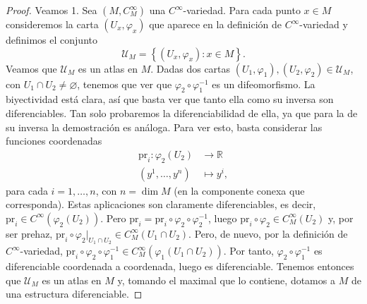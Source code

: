 \documentclass[12pt,a4paper]{book}
\theoremstyle{definition} \newtheorem{defn}[thm]{Definición}
\theoremstyle{definition} \newtheorem{ejemplo}[thm]{Ejemplo}
\theoremstyle{definition} \newtheorem{ejercicio}[thm]{Ejercicio}
\theoremstyle{remark} \newtheorem*{obs}{Observación}
\def\RR{\mathbb{R}}
\def\pr{\mathrm{pr}}
\begin{document}
\begin{proof}
		    Veamos 1. Sea $(M,C^\infty_M)$ una $C^{\infty}$-variedad. Para cada punto $x\in M$ consideremos la carta $(U_x,\varphi_x)$ que aparece en la definición de $C^{\infty}$-variedad y definimos el conjunto
		    \begin{equation*}
		      \mathcal{U}_M=\left\{ (U_x,\varphi_x): x\in M \right\}.
		    \end{equation*}
		    Veamos que $\mathcal{U}_M$ es un atlas en $M$. Dadas dos cartas $(U_1,\varphi_1), (U_2,\varphi_2) \in \mathcal{U}_M$, con $U_1 \cap U_2 \neq \varnothing$, tenemos que ver que $\varphi_2 \circ \varphi_1^{-1}$ es un difeomorfismo. La biyectividad está clara, así que basta ver que tanto ella como su inversa son diferenciables. Tan solo probaremos la diferenciabilidad de ella, ya que para la de su inversa la demostración es análoga. Para ver esto, basta considerar las funciones coordenadas
		    \begin{align*}
		      \pr_i :\varphi_2(U_2)&\longrightarrow \RR\\ 
		        (y^1,\dots,y^n) &\longmapsto y^i, 
		      \end{align*}
		      para cada $i=1,\dots,n$, con $n=\dim M$ (en la componente conexa que corresponda). Estas aplicaciones son claramente diferenciables, es decir, $\pr_i \in C^{\infty}(\varphi_2(U_2))$. Pero $\pr_i = \pr_i \circ \varphi_2 \circ \varphi_2^{-1}$, luego $\pr_i \circ \varphi_2 \in C^\infty_M(U_2)$ y, por ser prehaz, $\pr_i \circ \varphi_2|_{U_1 \cap U_2} \in C^\infty_M(U_1 \cap U_2)$. Pero, de nuevo, por la definición de $C^{\infty}$-variedad, $\pr_{i} \circ \varphi_2 \circ \varphi_1^{-1} \in C^\infty_M(\varphi_1(U_1 \cap U_2))$. Por tanto, $\varphi_2 \circ \varphi_1^{-1}$ es diferenciable coordenada a coordenada, luego es diferenciable. Tenemos entonces que $\mathcal{U}_M$ es un atlas en $M$ y, tomando el maximal que lo contiene, dotamos a $M$ de una estructura diferenciable.


\end{proof}
\end{document}

